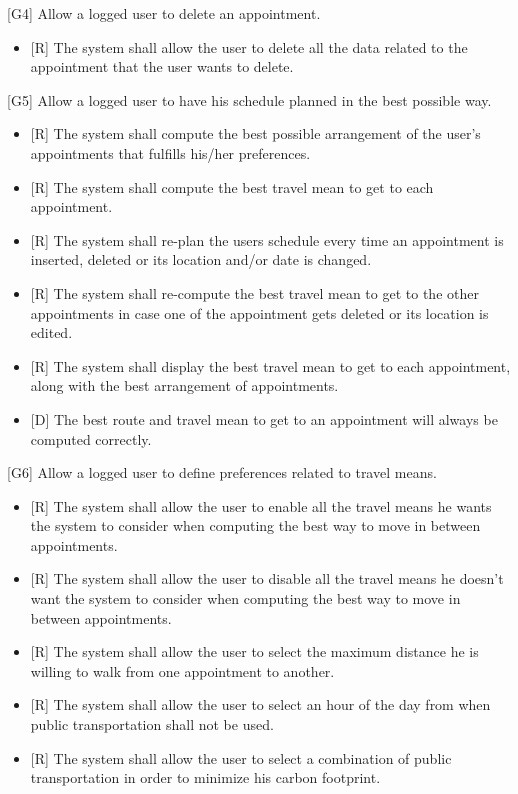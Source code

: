 \documentclass[12pt]{article}
\begin{document}
{[G4]} Allow a logged user to delete an appointment.
\begin{itemize}
    \item{[R]} The system shall allow the user to delete all the data related to the appointment that the user wants to delete.
\end{itemize}
{[G5]} Allow a logged user to have his schedule planned in the best possible way.
\begin{itemize}
    \item{[R]} The system shall compute the best possible arrangement of the user's appointments that fulfills his/her preferences.
    \item{[R]} The system shall compute the best travel mean to get to each appointment.
    \item{[R]} The system shall re-plan the users schedule every time an appointment is inserted, deleted or its location and/or date is changed.
    \item{[R]} The system shall re-compute the best travel mean to get to the other appointments in case one of the appointment gets deleted or its location is edited.
    \item{[R]} The system shall display the best travel mean to get to each appointment, along with the best arrangement of appointments.
    \item{[D]} The best route and travel mean to get to an appointment will always be computed correctly.
    
\end{itemize}
{[G6]} Allow a logged user to define preferences related to travel means.
\begin{itemize}
    \item{[R]} The system shall allow the user to enable all the travel means he wants the system to consider when computing the best way to move in between appointments.
    \item{[R]} The system shall allow the user to disable all the travel means he doesn't want the system to consider when computing the best way to move in between appointments.
    \item{[R]} The system shall allow the user to select the maximum distance he is willing to walk from one appointment to another.
    \item{[R]} The system shall allow the user to select an hour of the day from when public transportation shall not be used.
    \item{[R]} The system shall allow the user to select a combination of public transportation in order to minimize his carbon footprint.
\end{itemize}
\end{document}
